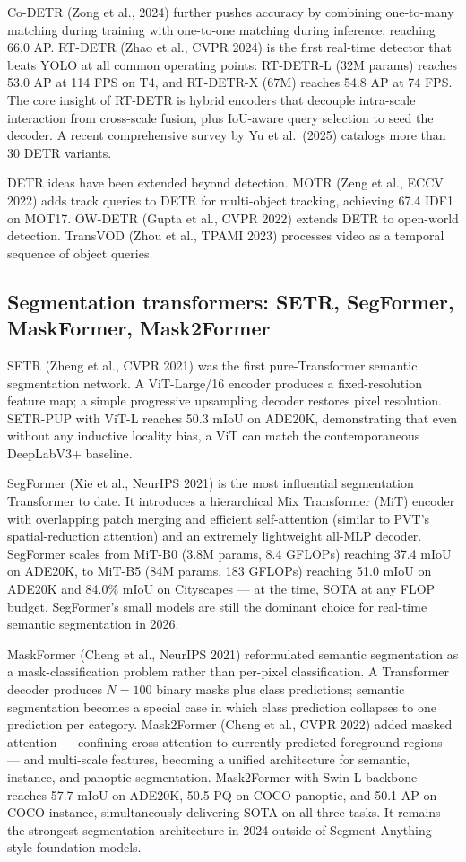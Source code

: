 Co-DETR (Zong et al., 2024) further pushes accuracy by combining one-to-many matching during training with one-to-one matching during inference, reaching 66.0 AP. RT-DETR (Zhao et al., CVPR 2024) is the first real-time detector that beats YOLO at all common operating points: RT-DETR-L (32M params) reaches 53.0 AP at 114 FPS on T4, and RT-DETR-X (67M) reaches 54.8 AP at 74 FPS. The core insight of RT-DETR is hybrid encoders that decouple intra-scale interaction from cross-scale fusion, plus IoU-aware query selection to seed the decoder. A recent comprehensive survey by Yu et al.~(2025) catalogs more than 30 DETR variants.

DETR ideas have been extended beyond detection. MOTR (Zeng et al., ECCV 2022) adds track queries to DETR for multi-object tracking, achieving 67.4 IDF1 on MOT17. OW-DETR (Gupta et al., CVPR 2022) extends DETR to open-world detection. TransVOD (Zhou et al., TPAMI 2023) processes video as a temporal sequence of object queries.

\subsection{Segmentation transformers: SETR, SegFormer, MaskFormer, Mask2Former}\label{segmentation-transformers-setr-segformer-maskformer-mask2former}

SETR (Zheng et al., CVPR 2021) was the first pure-Transformer semantic segmentation network. A ViT-Large/16 encoder produces a fixed-resolution feature map; a simple progressive upsampling decoder restores pixel resolution. SETR-PUP with ViT-L reaches 50.3 mIoU on ADE20K, demonstrating that even without any inductive locality bias, a ViT can match the contemporaneous DeepLabV3+ baseline.

SegFormer (Xie et al., NeurIPS 2021) is the most influential segmentation Transformer to date. It introduces a hierarchical Mix Transformer (MiT) encoder with overlapping patch merging and efficient self-attention (similar to PVT's spatial-reduction attention) and an extremely lightweight all-MLP decoder. SegFormer scales from MiT-B0 (3.8M params, 8.4 GFLOPs) reaching 37.4 mIoU on ADE20K, to MiT-B5 (84M params, 183 GFLOPs) reaching 51.0 mIoU on ADE20K and 84.0\% mIoU on Cityscapes --- at the time, SOTA at any FLOP budget. SegFormer's small models are still the dominant choice for real-time semantic segmentation in 2026.

MaskFormer (Cheng et al., NeurIPS 2021) reformulated semantic segmentation as a mask-classification problem rather than per-pixel classification. A Transformer decoder produces \(N=100\) binary masks plus class predictions; semantic segmentation becomes a special case in which class prediction collapses to one prediction per category. Mask2Former (Cheng et al., CVPR 2022) added masked attention --- confining cross-attention to currently predicted foreground regions --- and multi-scale features, becoming a unified architecture for semantic, instance, and panoptic segmentation. Mask2Former with Swin-L backbone reaches 57.7 mIoU on ADE20K, 50.5 PQ on COCO panoptic, and 50.1 AP on COCO instance, simultaneously delivering SOTA on all three tasks. It remains the strongest segmentation architecture in 2024 outside of Segment Anything-style foundation models.

